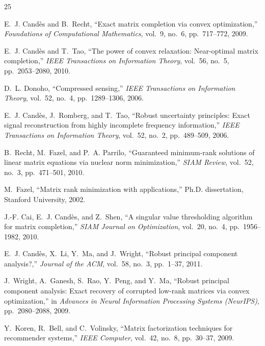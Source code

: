 \documentclass[conference]{IEEEtran}
\begin{document}

\begin{thebibliography}{25}

E.~J. Cand\`{e}s and B.~Recht,
``Exact matrix completion via convex optimization,''
\emph{Foundations of Computational Mathematics},
vol.~9, no.~6, pp.~717--772, 2009.

E.~J. Cand\`{e}s and T.~Tao,
``The power of convex relaxation: Near-optimal matrix completion,''
\emph{IEEE Transactions on Information Theory},
vol.~56, no.~5, pp.~2053--2080, 2010.

D.~L. Donoho,
``Compressed sensing,''
\emph{IEEE Transactions on Information Theory},
vol.~52, no.~4, pp.~1289--1306, 2006.

E.~J. Cand\`{e}s, J.~Romberg, and T.~Tao,
``Robust uncertainty principles: Exact signal reconstruction from highly incomplete frequency information,''
\emph{IEEE Transactions on Information Theory},
vol.~52, no.~2, pp.~489--509, 2006.

B.~Recht, M.~Fazel, and P.~A. Parrilo,
``Guaranteed minimum-rank solutions of linear matrix equations via nuclear norm minimization,''
\emph{SIAM Review},
vol.~52, no.~3, pp.~471--501, 2010.

M.~Fazel,
``Matrix rank minimization with applications,''
Ph.D. dissertation, Stanford University, 2002.

J.-F. Cai, E.~J. Cand\`{e}s, and Z.~Shen,
``A singular value thresholding algorithm for matrix completion,''
\emph{SIAM Journal on Optimization},
vol.~20, no.~4, pp.~1956--1982, 2010.

E.~J. Cand\`{e}s, X.~Li, Y.~Ma, and J.~Wright,
``Robust principal component analysis?,''
\emph{Journal of the ACM},
vol.~58, no.~3, pp.~1--37, 2011.

J.~Wright, A.~Ganesh, S.~Rao, Y.~Peng, and Y.~Ma,
``Robust principal component analysis: Exact recovery of corrupted low-rank matrices via convex optimization,''
in \emph{Advances in Neural Information Processing Systems (NeurIPS)},
pp.~2080--2088, 2009.

Y.~Koren, R.~Bell, and C.~Volinsky,
``Matrix factorization techniques for recommender systems,''
\emph{IEEE Computer},
vol.~42, no.~8, pp.~30--37, 2009.


\end{thebibliography}
\end{document}
